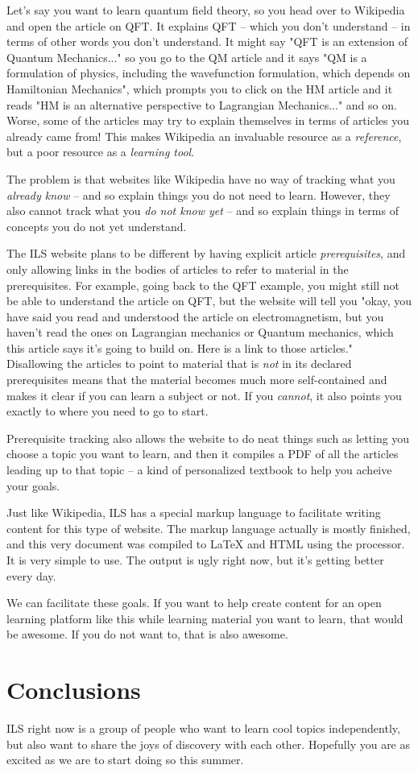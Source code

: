 \documentclass[mpinclude=true]{scrartcl}
\begin{document}
Let's say you want to learn quantum field theory, so you head over to
Wikipedia and open the article on QFT.  It explains QFT -- which you
don't understand -- in terms of other words you don't understand.  It
might say "QFT is an extension of Quantum Mechanics..." so you go to
the QM article and it says "QM is a formulation of physics, including
the wavefunction formulation, which depends on Hamiltonian Mechanics",
which prompts you to click on the HM article and it reads "HM is an
alternative perspective to Lagrangian Mechanics..." and so on.  Worse,
some of the articles may try to explain themselves in terms of
articles you already came from!  This makes Wikipedia an invaluable
resource as a \emph{reference}, but a poor resource as a \emph{learning tool}.

The problem is that websites like Wikipedia have no way of tracking
what you \emph{already know} -- and so explain things you do not need to
learn.  However, they also cannot track what you \emph{do not know yet} --
and so explain things in terms of concepts you do not yet understand.

The ILS website plans to be different by having explicit article
\emph{prerequisites}, and only allowing links in the bodies of articles to
refer to material in the prerequisites.  For example, going back to
the QFT example, you might still not be able to understand the article
on QFT, but the website will tell you "okay, you have said you read
and understood the article on electromagnetism, but you haven't read
the ones on Lagrangian mechanics or Quantum mechanics, which this
article says it's going to build on.  Here is a link to those
articles."  Disallowing the articles to point to material that is
\emph{not} in its declared prerequisites means that the material becomes
much more self-contained and makes it clear if you can learn a subject
or not.  If you \emph{cannot}, it also points you exactly to where you need
to go to start.

Prerequisite tracking also allows the website to do neat things such
as letting you choose a topic you want to learn, and then it compiles
a PDF of all the articles leading up to that topic -- a kind of
personalized textbook to help you acheive your goals.

Just like Wikipedia, ILS has a special markup language to facilitate
writing content for this type of website.  The markup language
actually is mostly finished, and this very document was compiled to
LaTeX and HTML using the processor.  It is very simple to use.  The
output is ugly right now, but it's getting better every day.

We can facilitate these goals.  If you want to help create content for
an open learning platform like this while learning material you want
to learn, that would be awesome.  If you do not want to, that is also
awesome.

\section{Conclusions}


ILS right now is a group of people who want to learn cool topics
independently, but also want to share the joys of discovery with each
other.  Hopefully you are as excited as we are to start doing so this
summer.
\end{document}
